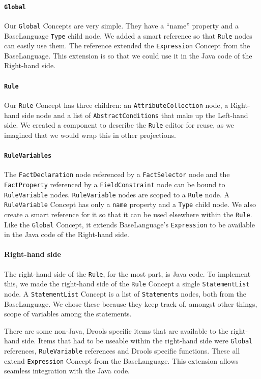 \paragraph{\texttt{Global}} Our \texttt{Global} Concepts are very simple.
They have a ``name'' property and a BaseLanguage \texttt{Type} child node.
We added a smart reference so that \texttt{Rule} nodes can easily use them.
The reference extended the \texttt{Expression} Concept from the BaseLanguage.
This extension is so that we could use it in the Java code of the Right-hand side.

\paragraph{\texttt{Rule}} Our \texttt{Rule} Concept has three children: an \texttt{AttributeCollection} node, a Right-hand side node and a list of \texttt{AbstractConditions} that make up the Left-hand side.
We created a component to describe the \texttt{Rule} editor for reuse, as we imagined that we would wrap this in other projections.

\paragraph{\texttt{RuleVariables}} The \texttt{FactDeclaration} node referenced by a \texttt{FactSelector} node and the \texttt{FactProperty} referenced by a \texttt{FieldConstraint} node can be bound to \texttt{RuleVariable} nodes.
\texttt{RuleVariable} nodes are scoped to a \texttt{Rule} node.
A \texttt{RuleVariable} Concept has only a \texttt{name} property and a \texttt{Type} child node.
We also create a smart reference for it so that it can be used elsewhere within the \texttt{Rule}.
Like the \texttt{Global} Concept, it extends BaseLanguage's \texttt{Expression} to be available in the Java code of the Right-hand side.

\paragraph{Right-hand side} The right-hand side of the \texttt{Rule}, for the most part, is Java code.
To implement this, we made the right-hand side of the \texttt{Rule} Concept a single \texttt{StatementList} node.
A \texttt{StatementList} Concept is a list of \texttt{Statements} nodes, both from the BaseLanguage.
We chose these because they keep track of, amongst other things, scope of variables among the statements.

There are some non-Java, Drools specific items that are available to the right-hand side.
Items that had to be useable within the right-hand side were \texttt{Global} references, \texttt{RuleVariable} references and Drools specific functions.
These all extend \texttt{Expression} Concept from the BaseLanguage.
This extension allows seamless integration with the Java code.

